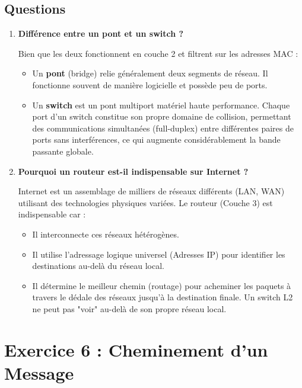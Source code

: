 \documentclass[11pt, a4paper]{article}
\newenvironment{reponse}{\begin{reponsebox}}{\end{reponsebox}}
\begin{document}
\subsection{Questions}
\begin{enumerate}
    \item \textbf{Différence entre un pont et un switch ?}
    \begin{reponse}
    Bien que les deux fonctionnent en couche 2 et filtrent sur les adresses MAC :
    \begin{itemize}
        \item Un \textbf{pont} (bridge) relie généralement deux segments de réseau. Il fonctionne souvent de manière logicielle et possède peu de ports.
        \item Un \textbf{switch} est un pont multiport matériel haute performance. Chaque port d'un switch constitue son propre domaine de collision, permettant des communications simultanées (full-duplex) entre différentes paires de ports sans interférences, ce qui augmente considérablement la bande passante globale.
    \end{itemize}
    \end{reponse}
    \item \textbf{Pourquoi un routeur est-il indispensable sur Internet ?}
    \begin{reponse}
    Internet est un assemblage de milliers de réseaux différents (LAN, WAN) utilisant des technologies physiques variées. Le routeur (Couche 3) est indispensable car :
    \begin{itemize}
        \item Il interconnecte ces réseaux hétérogènes.
        \item Il utilise l'adressage logique universel (Adresses IP) pour identifier les destinations au-delà du réseau local.
        \item Il détermine le meilleur chemin (routage) pour acheminer les paquets à travers le dédale des réseaux jusqu'à la destination finale. Un switch L2 ne peut pas "voir" au-delà de son propre réseau local.
    \end{itemize}
    \end{reponse}
\end{enumerate}
\clearpage
\section{Exercice 6 : Cheminement d'un Message}
\end{document}
